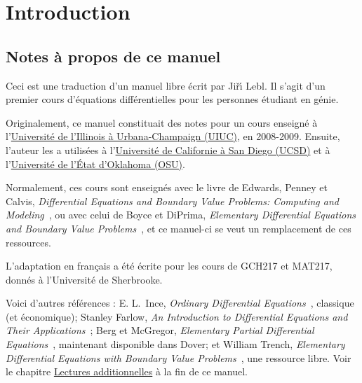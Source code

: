 \chapter*{Introduction} \label{intro:chapter}


\section{Notes à propos de ce manuel}
\label{notes:section}

Ceci est une traduction d'un manuel libre écrit par Ji\v{r}\'{\i} Lebl.  
Il s'agit d'un premier cours d'équations différentielles pour les personnes étudiant en génie.


Originalement, ce manuel constituait des notes pour un cours enseigné à l'\href{https://www.math.uiuc.edu/}{Université de l'Illinois à Urbana-Champaign (UIUC)}, en 2008-2009. Ensuite, l'auteur les a utilisées à l'\href{https://www.math.ucsd.edu/}{Université de Californie à San Diego (UCSD)} et à l'\href{https://math.okstate.edu/}{Université de l'État d'Oklahoma (OSU)}.

Normalement, ces cours sont enseignés avec le livre de Edwards, Penney et Calvis, 
\emph{Differential Equations and Boundary Value Problems: Computing and Modeling}~\cite{EP}, ou avec celui de Boyce et DiPrima,
\emph{Elementary Differential Equations and Boundary Value Problems}~\cite{BD}, et ce manuel-ci se veut un remplacement de ces ressources.

L'adaptation en français a été écrite pour les cours de GCH217 et MAT217, donnés à l'Université de Sherbrooke.

Voici d'autres références :
E. L.\ Ince, \emph{Ordinary Differential Equations}~\cite{I}, classique (et économique); 
Stanley Farlow, \emph{An Introduction to Differential Equations and Their Applications}~\cite{F}; 
Berg et McGregor, \emph{Elementary Partial Differential Equations}~\cite{BM}, maintenant disponible dans Dover; 
et William Trench, \emph{Elementary Differential Equations with Boundary Value Problems}~\cite{T}, une ressource libre.
Voir le chapitre \hyperref[furtherreading:chapter]{Lectures additionnelles} à la fin de ce manuel.

